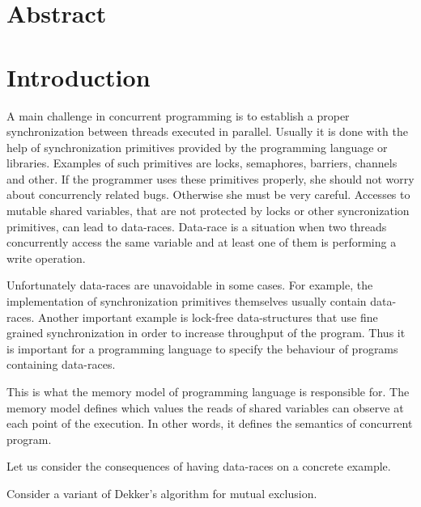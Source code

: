 \documentclass[a4paper,twoside,11pt]{article}
\author{}
\title{}
\date{}
\numberwithin{equation}{section}
\begin{document}
\maketitle

\section{Abstract}

\section{Introduction}

A main challenge in concurrent programming is 
to establish a proper synchronization between threads executed in parallel.     
Usually it is done with the help of synchronization primitives
provided by the programming language or libraries.
Examples of such primitives are locks, semaphores, barriers, channels and other.
If the programmer uses these primitives properly, she should not worry about concurrencly related bugs.
Otherwise she must be very careful. Accesses to mutable shared variables, 
that are not protected by locks or other syncronization primitives, can lead to data-races. 
Data-race is a situation when two threads concurrently access the same variable and at least one of them is performing a write operation.


Unfortunately data-races are unavoidable in some cases. 
For example, the implementation of synchronization primitives themselves usually contain data-races.
Another important example is lock-free data-structures that use fine grained synchronization in order 
to increase throughput of the program.
Thus it is important for a programming language to specify the behaviour of programs containing data-races.

This is what the memory model of programming language is responsible for.  
The memory model defines which values the reads of shared variables can observe at each point of the execution. 
In other words, it defines the semantics of concurrent program.

Let us consider the consequences of having data-races on a concrete example.

Consider a variant of Dekker's algorithm for mutual exclusion.
\end{document}
